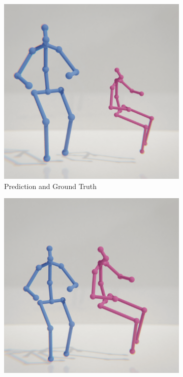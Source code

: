 \begin{figure}
    \centering
    \begin{subfigure}[b]{0.25\textwidth}
        \centering
        \includegraphics[width=\textwidth]{figures/h36_viz/proc_raw.png}
        \caption{Prediction and Ground Truth}
    \end{subfigure}
    \hfill
    \begin{subfigure}[b]{0.25\textwidth}
        \centering
        \includegraphics[width=\textwidth]{figures/h36_viz/proc_scale.png}

\end{subfigure}
\end{figure}
